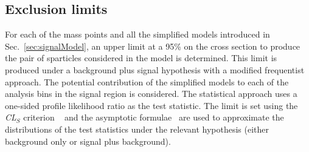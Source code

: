 
\subsection{Exclusion limits}

For each of the mass points and all the simplified models introduced
in Sec.~\ref{sec:signalModel}, an upper limit at a 95\% \CL on the
cross section to produce the pair of sparticles considered in the
model is determined. This limit is produced under a background plus
signal hypothesis with a modified frequentist approach. The potential
contribution of the simplified models to each of the analysis bins in
the signal region is considered. The statistical approach uses a
one-sided profile likelihood ratio as the test statistic. The limit is
set using the \emph{CL$_S$} criterion ~\cite{junk, read} and the
asymptotic formulae~\cite{Cowan:2010js} are used to approximate the
distributions of the test statistics under the relevant hypothesis
(either background only or signal plus background). 

